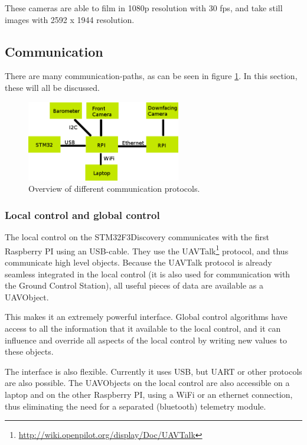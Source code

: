 \documentclass[11pt, a4paper, onecolumn, oneside, parskip=half]{scrartcl}
\begin{document}
These cameras are able to film in 1080p resolution with 30 fps, and take still images with 2592 x 1944 resolution.

\subsection{Communication}
\label{sec:arch:comm}
There are many communication-paths, as can be seen in figure \ref{fig:communication}. In this section, these will all be discussed.

\begin{figure}[ht]
\centering
\includegraphics[width=0.6\textwidth]{hwdesign2}
\caption{Overview of different communication protocols.}
\label{fig:communication}
\end{figure}

\subsubsection{Local control and global control}
\label{sec:arch:comm:localglobal}
The local control on the STM32F3Discovery communicates with the first Raspberry PI using an USB-cable. They use the UAVTalk\footnote{\url{http://wiki.openpilot.org/display/Doc/UAVTalk}} protocol, and thus communicate high level objects. Because the UAVTalk protocol is already seamless integrated in the local control (it is also used for communication with the Ground Control Station), all useful pieces of data are available as a UAVObject.

This makes it an extremely powerful interface. Global control algorithms have access to all the information that it available to the local control, and it can influence and override all aspects of the local control by writing new values to these objects.

The interface is also flexible. Currently it uses USB, but UART or other protocols are also possible. The UAVObjects on the local control are also accessible on a laptop and on the other Raspberry PI, using a WiFi or an ethernet connection, thus eliminating the need for a separated (bluetooth) telemetry module.
\end{document}
